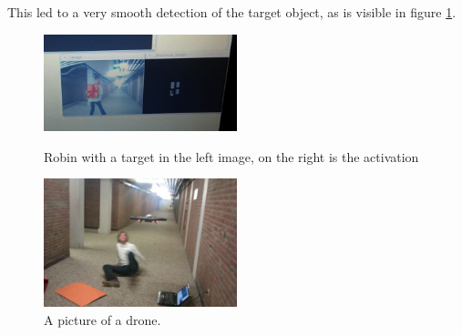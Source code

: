 \documentclass[a4paper,10pt]{article}
\begin{document}
This led to a very smooth detection of the target object, as is visible in figure \ref{fig:robinPresentActivation}. 

\begin{figure}[h!]
	\caption{Robin with a target in the left image, on the right is the activation}
	\centering
	\includegraphics[width=0.5\textwidth]{images/robinPresentActivation}
	\label{fig:robinPresentActivation}
\end{figure}

\begin{figure}[h!]
	\caption{A picture of a drone.}
	\centering
	\includegraphics[width=0.5\textwidth]{images/droneAttack}
\end{figure}

\end{document}

